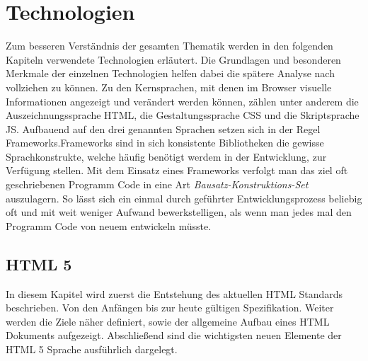 \section{Technologien}\label{technologien}
Zum besseren Verständnis der gesamten Thematik werden in den folgenden Kapiteln verwendete Technologien erläutert. Die Grundlagen und besonderen Merkmale der einzelnen Technologien helfen dabei die spätere Analyse nach vollziehen zu können. Zu den Kernsprachen, mit denen im Browser visuelle Informationen angezeigt und verändert werden können, zählen unter anderem die Auszeichnungssprache HTML, die Gestaltungssprache CSS und die Skriptsprache JS. Aufbauend auf den drei genannten Sprachen setzen sich in der Regel Frameworks.Frameworks sind in sich konsistente Bibliotheken die gewisse Sprachkonstrukte, welche häufig benötigt werdem in der Entwicklung, zur Verfügung stellen. Mit dem Einsatz eines Frameworks verfolgt man das ziel oft geschriebenen Programm Code in eine Art \textit{Bausatz-Konstruktions-Set} auszulagern. So lässt sich ein einmal durch geführter Entwicklungsprozess beliebig oft und mit weit weniger Aufwand bewerkstelligen, als wenn man jedes mal den Programm Code von neuem entwickeln müsste.

\subsection{HTML 5}
In diesem Kapitel wird zuerst die Entstehung des aktuellen HTML Standards beschrieben. Von den Anfängen bis zur heute gültigen Spezifikation. Weiter werden die Ziele näher definiert, sowie der allgemeine Aufbau eines HTML Dokuments aufgezeigt. Abschließend sind die wichtigsten neuen Elemente der HTML 5 Sprache ausführlich dargelegt.

